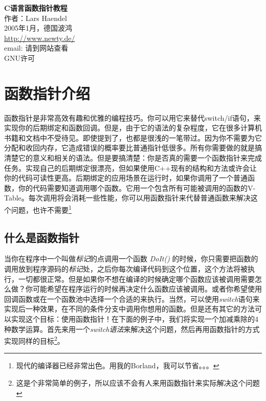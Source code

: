 \documentclass[11pt,a4paper]{article}
\begin{document}
\fancyhead{}
\renewcommand{\headrulewidth}{0pt}
\begin{center}
\textbf{\huge{C语言函数指针教程}}\\
作者：Lars Haendel\\
2005年1月，德国波鸿\\
\href{http://www.newty.de/}{http://www.newty.de/}\\
email: 请到网站查看\\
GNU许可
\end{center}

\tableofcontents

\section{函数指针介绍}
函数指针是非常高效有趣和优雅的编程技巧。你可以用它来替代switch/if语句，来实现你的后期绑定和函数回调。但是，由于它的语法的复杂程度，它在很多计算机书籍和文档中不受待见。即使提到了，也都是很浅的一笔带过。因为你不需要为它分配和收回内存，它造成错误的概率要比普通指针低很多。所有你需要做的就是搞清楚它的意义和相关的语法。但是要搞清楚：你是否真的需要一个函数指针来完成任务。实现自己的后期绑定很漂亮，但如果使用C++现有的结构和方法或许会让你的代码可读性更高。后期绑定的应用场景在运行时，如果你调用了一个普通函数，你的代码需要知道调用哪个函数。它用一个包含所有可能被调用的函数的V-Table。每次调用将会消耗一些性能，你可以用函数指针来代替普通函数来解决这个问题，也许不需要\footnote{现代的编译器已经非常出色。用我的Borland，我可以节省。。。}


\subsection{什么是函数指针}
当你在程序中一个叫做\textit{标记}的点调用一个函数 \textit{DoIt()} 的时候，你只需要把函数的调用放到程序源码的\textit{标记}处，之后你每次编译代码到这个位置，这个方法将被执行，一切都很正常。但是如果你不想在编译的时候确定哪个函数应该被调用需要怎么做？你可能希望在程序运行的时候再决定什么函数应该被调用。或者你希望使用回调函数或在一个函数池中选择一个合适的来执行。当然，可以使用\textit{switch}语句来实现后一种效果，在不同的条件分支中调用你想用的函数。但是还有其它的方法可以实现这个目标：使用函数指针！在下面的例子中，我们将实现一个加减乘除的4种数学运算。首先来用一个\textit{switch语法}来解决这个问题，然后再用函数指针的方式实现同样的目标\footnote{这是个非常简单的例子，所以应该不会有人来用函数指针来实际解决这个问题}。
\end{document}
